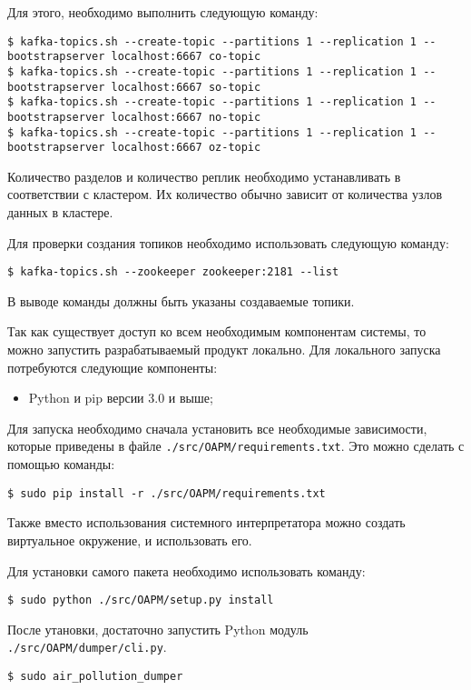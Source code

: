 Для этого, необходимо выполнить следующую команду:
\begin{lstlisting}    
$ kafka-topics.sh --create-topic --partitions 1 --replication 1 --bootstrapserver localhost:6667 co-topic
$ kafka-topics.sh --create-topic --partitions 1 --replication 1 --bootstrapserver localhost:6667 so-topic
$ kafka-topics.sh --create-topic --partitions 1 --replication 1 --bootstrapserver localhost:6667 no-topic
$ kafka-topics.sh --create-topic --partitions 1 --replication 1 --bootstrapserver localhost:6667 oz-topic
\end{lstlisting}

Количество разделов и количество реплик необходимо устанавливать в соответствии с кластером.
Их количество обычно зависит от количества узлов данных в кластере.

Для проверки создания топиков необходимо использовать следующую команду:
\begin{lstlisting}
$ kafka-topics.sh --zookeeper zookeeper:2181 --list
\end{lstlisting}
В выводе команды должны быть указаны создаваемые топики.

Так как существует доступ ко всем необходимым компонентам системы, то можно запустить разрабатываемый продукт локально.
Для локального запуска потребуются следующие компоненты:

\begin{itemize}
    \item Python и pip версии 3.0 и выше;
\end{itemize}

Для запуска необходимо сначала установить все необходимые зависимости, которые приведены в файле \texttt{./src/OAPM/requirements.txt}.
Это можно сделать с помощью команды:
\begin{lstlisting}
$ sudo pip install -r ./src/OAPM/requirements.txt
\end{lstlisting}
Также вместо использования системного интерпретатора можно создать виртуальное окружение, и использовать его.

Для установки самого пакета необходимо использовать команду:
\begin{lstlisting}
$ sudo python ./src/OAPM/setup.py install
\end{lstlisting}

После утановки, достаточно запустить Python модуль \texttt{./src/OAPM/dumper/cli.py}.
\begin{lstlisting}
$ sudo air_pollution_dumper
\end{lstlisting}

